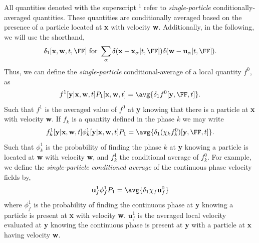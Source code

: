 All quantities denoted with the superscript $^1$ refer to \textit{single-particle} conditionally-averaged quantities. 
These quantities are conditionally averaged based on the presence of a particle located at \textbf{x} with velocity \textbf{w}.
Additionally, in the following, we will use the shorthand,
\begin{equation}
    \delta_1[\textbf{x},\textbf{w},t,\FF]  \text{ for } \sum_\alpha \delta(\textbf{x} - \textbf{x}_\alpha[t,\FF]) \delta(\textbf{w} - \textbf{u}_\alpha[t,\FF]). 
    \label{eq:delta_1}
\end{equation}  
Thus, we can define the \textit{single-particle} conditional-average of a local quantity $f^0$, as 
\begin{equation}
    f^1[\textbf{y}|\textbf{x},\textbf{w},t] P_1[\textbf{x},\textbf{w},t] = \avg{\delta_1 f^0[\textbf{y},\FF,t]}.
\end{equation}
Such that $f^1$ is the averaged value of $f^0$ at \textbf{y} knowing that there is a particle at \textbf{x} with velocity \textbf{w}. 
If $f_k$ is a quantity defined in the phase $k$ we may write 
\begin{equation*}
    f^1_k[\textbf{y}|\textbf{x},\textbf{w},t] \phi_k^1[\textbf{y}|\textbf{x},\textbf{w},t]  P_1 = \avg{\delta_1 (\chi_k f^0_k) [\textbf{y},\FF,t]}.
\end{equation*}
Such that $\phi_k^1$ is the probability of finding the phase $k$ at \textbf{y} knowing a particle is located at \textbf{w} with velocity \textbf{w}, and $f_k^1$ the conditional average of $f_k^0$. 
For example, we define the \textit{single-particle conditioned average} of the continuous phase velocity fields by, 
\begin{equation*}
    \textbf{u}_f^1 \phi_f^1 P_1
    = \avg{\delta_1 \chi_f \textbf{u}_f^0}
\end{equation*} 
where $\phi_f^1$ is the probability of finding the continuous phase at \textbf{y} knowing a particle is present at \textbf{x} with velocity \textbf{w}. 
$\textbf{u}_f^1$ is the averaged local velocity evaluated at \textbf{y} knowing the continuous phase is present at \textbf{y} with a particle at \textbf{x} having velocity \textbf{w}. 

